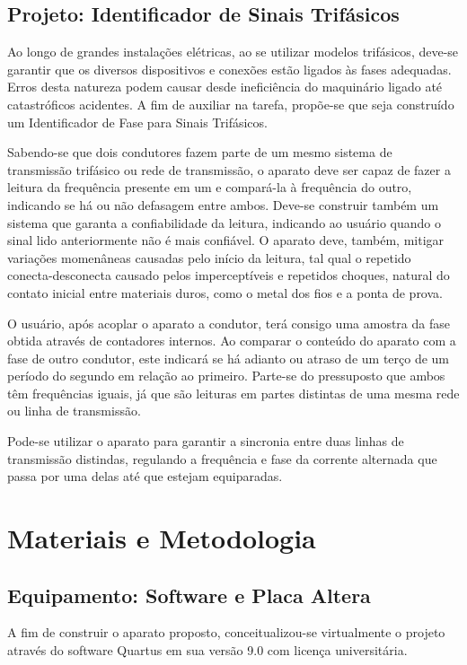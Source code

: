 \documentclass[12pt,a4paper,openany]{abntex2}
\begin{document}
\section{Projeto: Identificador de Sinais Trifásicos}

Ao longo de grandes instalações elétricas, ao se utilizar modelos trifásicos, deve-se garantir que os diversos dispositivos e conexões estão ligados às fases adequadas. Erros desta natureza podem causar desde ineficiência do maquinário ligado até catastróficos acidentes. A fim de auxiliar na tarefa, propõe-se que seja construído um Identificador de Fase para Sinais Trifásicos.

Sabendo-se que dois condutores fazem parte de um mesmo sistema de transmissão trifásico ou rede de transmissão, o aparato deve ser capaz de fazer a leitura da frequência presente em um e compará-la à frequência do outro, indicando se há ou não defasagem entre ambos. Deve-se construir também um sistema que garanta a confiabilidade da leitura, indicando ao usuário quando o sinal lido anteriormente não é mais confiável. O aparato deve, também, mitigar variações momenâneas causadas pelo início da leitura, tal qual o repetido conecta-desconecta causado pelos imperceptíveis e repetidos choques, natural do contato inicial entre materiais duros, como o metal dos fios e a ponta de prova.

O usuário, após acoplar o aparato a condutor, terá consigo uma amostra da fase obtida através de contadores internos. Ao comparar o conteúdo do aparato com a fase de outro condutor, este indicará se há adianto ou atraso de um terço de um período do segundo em relação ao primeiro. Parte-se do pressuposto que ambos têm frequências iguais, já que são leituras em partes distintas de uma mesma rede ou linha de transmissão.

Pode-se utilizar o aparato para garantir a sincronia entre duas linhas de transmissão distindas, regulando a frequência e fase da corrente alternada que passa por uma delas até que estejam equiparadas.

\chapter{Materiais e Metodologia}

\section{Equipamento: Software e Placa Altera}

A fim de construir o aparato proposto, conceitualizou-se virtualmente o projeto através do software Quartus em sua versão 9.0 com licença universitária.
\end{document}

